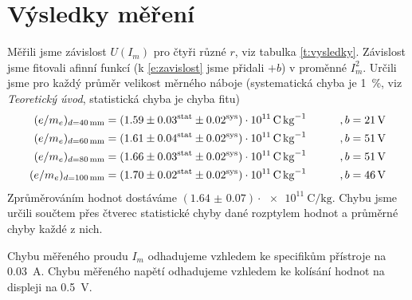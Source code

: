 \section*{Výsledky měření}
Měřili jsme závislost $U(I_m)$ pro čtyři různé $r$, viz tabulka \ref{t:vysledky}.
Závislost jsme fitovali afinní funkcí (k \eqref{e:zavislost} jsme přidali $+b$) v proměnné $I_m^2$. Určili jsme pro každý průměr velikost měrného náboje (systematická chyba je \SI{1}{\percent}, viz \emph{Teoretický úvod}, statistická chyba je chyba fitu)
\begin{align*}
        (e/m_e)_{d=\SI{40}{\mm}} &= \chyba{1.59}{0.03}{0.02} \qquad &, b &= \SI{21}{\volt}\\
        (e/m_e)_{d=\SI{60}{\mm}} &= \chyba{1.61}{0.04}{0.02} \qquad &, b &= \SI{51}{\volt}\\
        (e/m_e)_{d=\SI{80}{\mm}} &= \chyba{1.66}{0.03}{0.02} \qquad &, b &= \SI{51}{\volt}\\
        (e/m_e)_{d=\SI{100}{\mm}} &= \chyba{1.70}{0.02}{0.02} \qquad &, b &= \SI{46}{\volt}\\
\end{align*}
Zprůměrováním hodnot dostáváme $(\num[separate-uncertainty=true]{1.64(7)})\cdot\SI{e11}{\coulomb\per\kg}$. Chybu jsme určili součtem přes čtverec statistické chyby dané rozptylem hodnot a průměrné chyby každé z nich.


Chybu měřeného proudu $I_m$ odhadujeme vzhledem ke specifikům přístroje na \SI{0.03}{\ampere}. Chybu měřeného napětí odhadujeme vzhledem ke kolísání hodnot na displeji na \SI{0.5}{\volt}.


